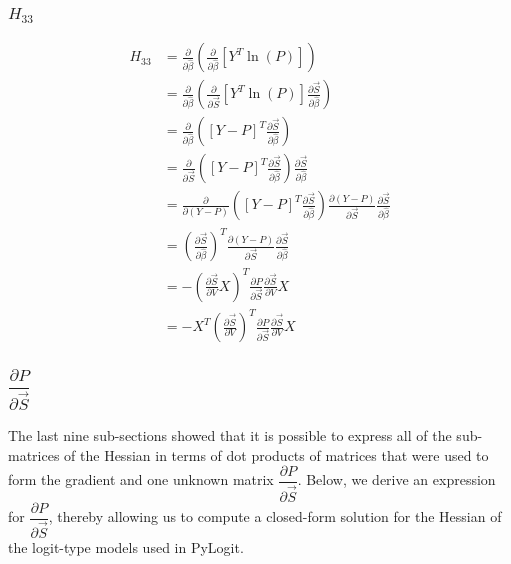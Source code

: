 \documentclass{article}
\begin{document}
\subsubsection{$H_{33}$}
\begin{equation}
\begin{aligned}
H_{33} &= \frac{\partial}{\partial \hat{\beta}}  \left( \frac{\partial}{\partial \hat{\beta}}  \left[ Y^T \ln \left( P \right) \right] \right) 
\\
&= \frac{\partial}{\partial \hat{\beta}}  \left( \frac{\partial}{\partial \vec{S}}  \left[ Y^T \ln \left( P \right) \right] \frac{\partial \vec{S}}{\partial \hat{\beta}} \right)
\\
&= \frac{\partial}{\partial \hat{\beta}}  \left( \left[ Y - P \right]^T \frac{\partial \vec{S}}{\partial \hat{\beta}} \right) 
\\
&= \frac{\partial}{\partial \vec{S}}  \left( \left[ Y - P \right]^T \frac{\partial \vec{S}}{\partial \hat{\beta}} \right) \frac{\partial \vec{S}}{\partial \hat{\beta}} 
\\
&= \frac{\partial}{\partial \left( Y - P \right)}  \left( \left[ Y - P \right]^T \frac{\partial \vec{S}}{\partial \hat{\beta}} \right) \frac{\partial \left( Y - P \right)}{\partial \vec{S}} \frac{\partial \vec{S}}{\partial \hat{\beta}} 
\\
&= \left( \frac{\partial \vec{S}}{\partial \hat{\beta}} \right)^T \frac{\partial \left( Y - P \right)}{\partial \vec{S}} \frac{\partial \vec{S}}{\partial \hat{\beta}} 
\\
&= - \left( \frac{\partial \vec{S}}{\partial V} X \right)^T \frac{\partial P}{\partial \vec{S}} \frac{\partial \vec{S}}{\partial V} X \\
&= - X^T \left( \frac{\partial \vec{S}}{\partial V} \right)^T \frac{\partial P}{\partial \vec{S}} \frac{\partial \vec{S}}{\partial V} X
\end{aligned}
\end{equation}

\subsubsection{$\dfrac{\partial P}{\partial \vec{S}}$}
The last nine sub-sections showed that it is possible to express all of the sub-matrices of the Hessian in terms of dot products of matrices that were used to form the gradient and one unknown matrix $\dfrac{\partial P}{\partial \vec{S}}$. Below, we derive an expression for $\dfrac{\partial P}{\partial \vec{S}}$, thereby allowing us to compute a closed-form solution for the Hessian of the logit-type models used in PyLogit.
\end{document}
